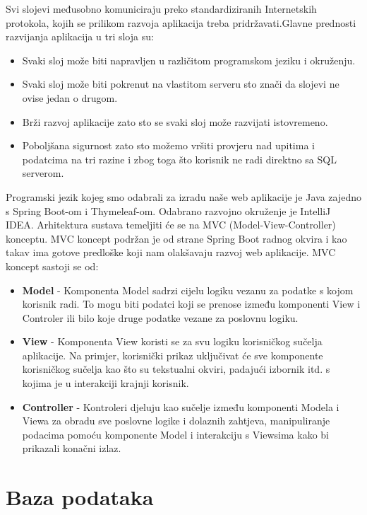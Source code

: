 			Svi slojevi međusobno komuniciraju preko standardiziranih Internetskih protokola, kojih se prilikom razvoja 
			aplikacija treba pridržavati.Glavne prednosti razvijanja aplikacija u tri sloja su:
			\begin{itemize}
				\item Svaki sloj može biti napravljen u različitom programskom jeziku i okruženju.
				\item Svaki sloj može biti pokrenut na vlastitom serveru sto znači da slojevi ne ovise jedan o drugom.
				\item Brži razvoj aplikacije zato sto se svaki sloj može razvijati istovremeno.
				\item Poboljšana sigurnost zato sto možemo vršiti provjeru nad upitima i podatcima na tri razine i zbog toga što korisnik ne radi direktno sa SQL serverom.
			\end{itemize}
			Programski jezik kojeg smo odabrali za izradu naše web aplikacije je Java zajedno s Spring Boot-om i Thymeleaf-om. 
			Odabrano razvojno okruženje je IntelliJ IDEA. Arhitektura sustava temeljiti  će se na MVC 
			(Model-View-Controller) konceptu. MVC koncept podržan je od strane Spring Boot radnog okvira i kao takav ima gotove predloške koji nam olakšavaju razvoj web aplikacije.
			MVC koncept sastoji se od:
		\begin{itemize}
			\item \textbf{Model} - Komponenta Model sadrzi cijelu logiku vezanu za podatke s kojom korisnik radi. To mogu biti podatci koji se prenose između komponenti View i Controler ili bilo koje druge podatke vezane za poslovnu logiku.
			\item \textbf{View} - Komponenta View koristi se za svu logiku korisničkog sučelja aplikacije.  Na primjer, korisnički prikaz uključivat će sve komponente korisničkog sučelja kao što su tekstualni okviri, padajući izbornik itd. s kojima je u interakciji krajnji korisnik.
			\item \textbf{Controller} - Kontroleri djeluju kao sučelje između komponenti Modela i Viewa za obradu sve poslovne logike i dolaznih zahtjeva, manipuliranje podacima pomoću komponente Model i interakciju s Viewsima kako bi prikazali konačni izlaz.
		\end{itemize} 
		\eject
			
		\section{Baza podataka}
			
